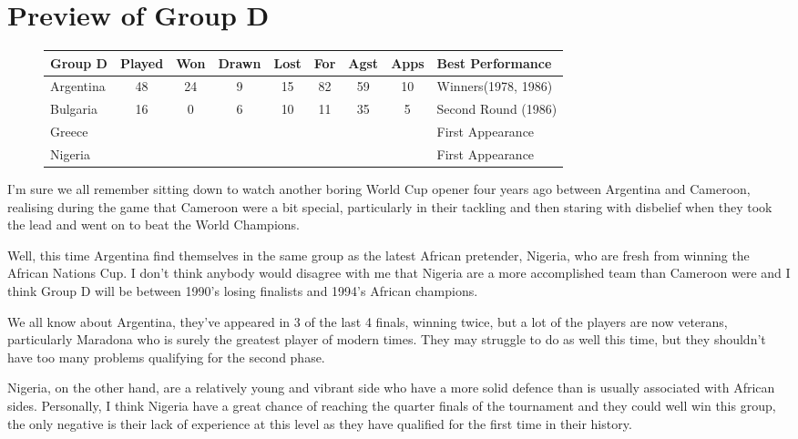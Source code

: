 \chapter{Preview of Group D}
\newline
\newline
\begin{figure}[H]
\small
\begin{tabular}{l c c c c c c c l}
Group D & Played & Won & Drawn & Lost & For & Agst & Apps & Best Performance\\ \hline
Argentina & 48 & 24 & 9 & 15 & 82 & 59 & 10 & Winners(1978, 1986) \\
Bulgaria & 16 & 0 & 6 & 10 & 11 & 35 & 5 & Second Round (1986) \\
Greece & & & & & & & & First Appearance \\
Nigeria & & & & & & & & First Appearance \\ \hline
\end{tabular}
\normalsize
\end{figure}
I'm sure we all remember sitting down to watch another boring World Cup opener
four years ago between Argentina and Cameroon, realising during the game that
Cameroon were a bit special, particularly in their tackling and then staring
with disbelief when they took the lead and went on to beat the World Champions.

Well, this time Argentina find themselves in the same group as the latest 
African pretender, Nigeria, who are fresh from winning the African Nations Cup.
I don't think anybody would disagree with me that Nigeria are a more 
accomplished team than Cameroon were and I think Group D will be between 1990's
losing finalists and 1994's African champions.

We all know about Argentina, they've appeared in 3 of the last 4 finals, 
winning twice, but a lot of the players are now veterans, particularly 
Maradona who is surely the greatest player of modern times. They may struggle 
to do as well this time, but they shouldn't have too many problems qualifying 
for the second phase.

Nigeria, on the other hand, are a relatively young and vibrant side who have a
more solid defence than is usually associated with African sides. Personally, I
think Nigeria have a great chance of reaching the quarter finals of the 
tournament and they could well win this group, the only negative is their lack
of experience at this level as they have qualified for the first time in their
history.


